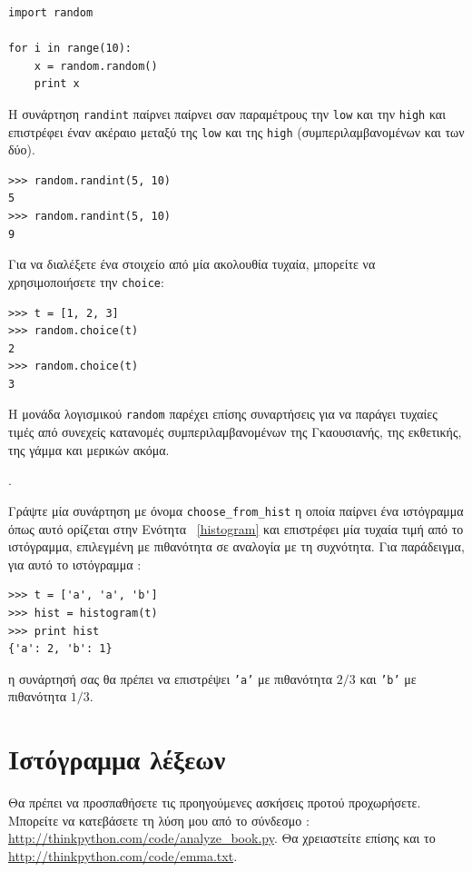 \documentclass[10pt]{book}
\begin{document}
\begin{verbatim}
import random

for i in range(10):
    x = random.random()
    print x
\end{verbatim}
%
 Η συνάρτηση  {\tt randint}  παίρνει παίρνει σαν παραμέτρους την  {\tt low}  και την  {\tt high}  και επιστρέφει έναν ακέραιο μεταξύ της  {\tt low}  και της  {\tt high}  (συμπεριλαμβανομένων και των δύο).

\begin{verbatim}
>>> random.randint(5, 10)
5
>>> random.randint(5, 10)
9
\end{verbatim}
%
 Για να διαλέξετε ένα στοιχείο από μία ακολουθία τυχαία, μπορείτε να χρησιμοποιήσετε την {\tt choice}:

\begin{verbatim}
>>> t = [1, 2, 3]
>>> random.choice(t)
2
>>> random.choice(t)
3
\end{verbatim}
%
 Η μονάδα λογισμικού  {\tt random}  παρέχει επίσης συναρτήσεις για να παράγει τυχαίες τιμές από συνεχείς κατανομές συμπεριλαμβανομένων της Γκαουσιανής, της εκθετικής, της γάμμα και μερικών ακόμα.

\begin{exercise}.

Γράψτε μία συνάρτηση με όνομα  \verb"choose_from_hist"  η οποία παίρνει ένα ιστόγραμμα όπως αυτό ορίζεται στην Ενότητα ~\ref{histogram}  και επιστρέφει μία τυχαία τιμή από το ιστόγραμμα, επιλεγμένη με πιθανότητα σε αναλογία με τη συχνότητα. Για παράδειγμα, για αυτό το ιστόγραμμα :

\begin{verbatim}
>>> t = ['a', 'a', 'b']
>>> hist = histogram(t)
>>> print hist
{'a': 2, 'b': 1}
\end{verbatim}
%
 η συνάρτησή σας θα πρέπει να επιστρέψει  {\tt 'a'}  με πιθανότητα $2/3$ και  {\tt 'b'}  με πιθανότητα $1/3$.
\end{exercise}


\section{Ιστόγραμμα λέξεων}

Θα πρέπει να προσπαθήσετε τις προηγούμενες ασκήσεις προτού προχωρήσετε. Μπορείτε να κατεβάσετε τη λύση μου από 
το σύνδεσμο  : \url{http://thinkpython.com/code/analyze_book.py}.  Θα χρειαστείτε επίσης και το  \url{http://thinkpython.com/code/emma.txt}.
\end{document}

